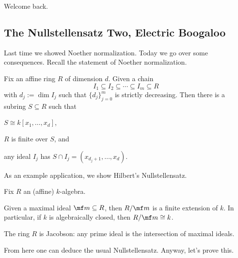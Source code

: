 \documentclass[../notes.tex]{subfiles}
\begin{document}

Welcome back.

\subsection{The Nullstellensatz Two, Electric Boogaloo}
Last time we showed Noether normalization. Today we go over some consequences. Recall the statement of Noether normalization.
\begin{theorem}
	Fix an affine ring $R$ of dimension $d$. Given a chain
	\[I_1\subseteq I_2\subseteq\cdots\subseteq I_m\subseteq R\]
	with $d_j:=\dim I_j$ such that $\{d_j\}_{j=0}^m$ is strictly decreasing. Then there is a subring $S\subseteq R$ such that
	\begin{listalph}
		\item $S\cong k[x_1,\ldots,x_d]$,
		\item $R$ is finite over $S$, and
		\item any ideal $I_j$ has $S\cap I_j=(x_{d_j+1},\ldots,x_d)$.
	\end{listalph}
\end{theorem}
As an example application, we show Hilbert's Nullstellensatz.
\begin{theorem}[Nullstellensatz]
	Fix $R$ an (affine) $k$-algebra.
	\begin{listalph}
		\item Given a maximal ideal $\mf m\subseteq R$, then $R/\mf m$ is a finite extension of $k$. In particular, if $k$ is algebraically closed, then $R/\mf m\cong k$.
		\item The ring $R$ is Jacobson: any prime ideal is the intersection of maximal ideals.
	\end{listalph}
\end{theorem}
From here one can deduce the usual Nullstellensatz. Anyway, let's prove this.
\end{document}

